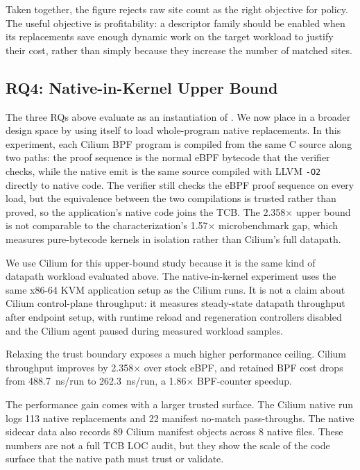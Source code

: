 Taken together, the figure rejects raw site count as the right objective for \lang policy. The useful objective is profitability: a descriptor family should be enabled when its replacements save enough dynamic work on the target workload to justify their cost, rather than simply because they increase the number of matched sites.


\subsection{RQ4: Native-in-Kernel Upper Bound}
\label{subsec:native_upper_bound}

The three RQs above evaluate \lang as an instantiation of \tool. We now place \tool in a broader design space by using \tool itself to load whole-program native replacements. In this experiment, each Cilium BPF program is compiled from the same C source along two paths: the proof sequence is the normal eBPF bytecode that the verifier checks, while the native emit is the same source compiled with LLVM \texttt{-O2} directly to native code. The verifier still checks the eBPF proof sequence on every load, but the equivalence between the two compilations is trusted rather than proved, so the application's native code joins the TCB. The 2.358$\times$ upper bound is not comparable to the characterization's 1.57$\times$ microbenchmark gap, which measures pure-bytecode kernels in isolation rather than Cilium's full datapath.

We use Cilium for this upper-bound study because it is the same kind of datapath workload evaluated above. The native-in-kernel experiment uses the same x86-64 KVM application setup as the Cilium \lang runs. It is not a claim about Cilium control-plane throughput: it measures steady-state datapath throughput after endpoint setup, with runtime reload and regeneration controllers disabled and the Cilium agent paused during measured workload samples.

Relaxing the trust boundary exposes a much higher performance ceiling. Cilium throughput improves by 2.358$\times$ over stock eBPF, and retained BPF cost drops from 488.7~ns/run to 262.3~ns/run, a 1.86$\times$ BPF-counter speedup.

The performance gain comes with a larger trusted surface. The Cilium native run logs 113 native replacements and 22 manifest no-match pass-throughs. The native sidecar data also records 89 Cilium manifest objects across 8 native files. These numbers are not a full TCB LOC audit, but they show the scale of the code surface that the native path must trust or validate.

